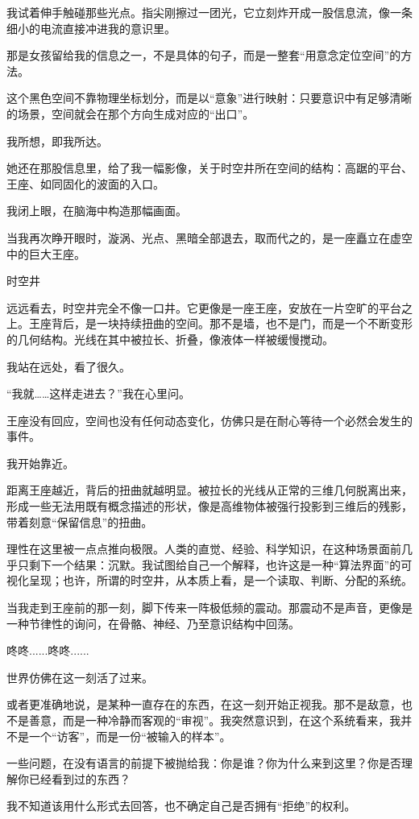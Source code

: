 我试着伸手触碰那些光点。指尖刚擦过一团光，它立刻炸开成一股信息流，像一条细小的电流直接冲进我的意识里。

那是女孩留给我的信息之一，不是具体的句子，而是一整套“用意念定位空间”的方法。

这个黑色空间不靠物理坐标划分，而是以“意象”进行映射：只要意识中有足够清晰的场景，空间就会在那个方向生成对应的“出口”。

我所想，即我所达。

她还在那股信息里，给了我一幅影像，关于时空井所在空间的结构：高踞的平台、王座、如同固化的波面的入口。

我闭上眼，在脑海中构造那幅画面。

当我再次睁开眼时，漩涡、光点、黑暗全部退去，取而代之的，是一座矗立在虚空中的巨大王座。

时空井

远远看去，时空井完全不像一口井。它更像是一座王座，安放在一片空旷的平台之上。王座背后，是一块持续扭曲的空间。那不是墙，也不是门，而是一个不断变形的几何结构。光线在其中被拉长、折叠，像液体一样被缓慢搅动。

我站在远处，看了很久。

“我就……这样走进去？”我在心里问。

王座没有回应，空间也没有任何动态变化，仿佛只是在耐心等待一个必然会发生的事件。

我开始靠近。

距离王座越近，背后的扭曲就越明显。被拉长的光线从正常的三维几何脱离出来，形成一些无法用既有概念描述的形状，像是高维物体被强行投影到三维后的残影，带着刻意“保留信息”的扭曲。

理性在这里被一点点推向极限。人类的直觉、经验、科学知识，在这种场景面前几乎只剩下一个结果：沉默。我试图给自己一个解释，也许这是一种“算法界面”的可视化呈现；也许，所谓的时空井，从本质上看，是一个读取、判断、分配的系统。

当我走到王座前的那一刻，脚下传来一阵极低频的震动。那震动不是声音，更像是一种节律性的询问，在骨骼、神经、乃至意识结构中回荡。

咚咚......咚咚......

世界仿佛在这一刻活了过来。

或者更准确地说，是某种一直存在的东西，在这一刻开始正视我。那不是敌意，也不是善意，而是一种冷静而客观的“审视”。我突然意识到，在这个系统看来，我并不是一个“访客”，而是一份“被输入的样本”。

一些问题，在没有语言的前提下被抛给我：你是谁？你为什么来到这里？你是否理解你已经看到过的东西？

我不知道该用什么形式去回答，也不确定自己是否拥有“拒绝”的权利。

